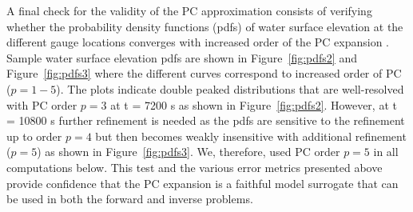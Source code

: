
 
A final check for the validity of the PC approximation 
consists of verifying whether the probability density
functions (pdfs) of water surface elevation at the different gauge locations
converges with increased order of the PC expansion  .  Sample
water surface elevation pdfs are shown in Figure~\ref{fig:pdfs2}
and Figure~\ref{fig:pdfs3} where
the different curves correspond to increased order of PC ($p= 1-5$).
The plots indicate double peaked distributions that are
well-resolved with PC order $p=3$ at t = 7200 s as shown in Figure~\ref{fig:pdfs2}.
However, at t = 10800 s further refinement is needed as the pdfs are
sensitive to the refinement up to order $p=4$ but then becomes weakly 
insensitive with additional refinement  ($p = 5$) as shown in Figure~\ref{fig:pdfs3}. 
We, therefore, used PC order $p = 5$ in all computations below.
This test and the various error metrics presented above provide confidence that the PC expansion is a faithful 
model surrogate that can be used in both the forward and inverse problems. 

